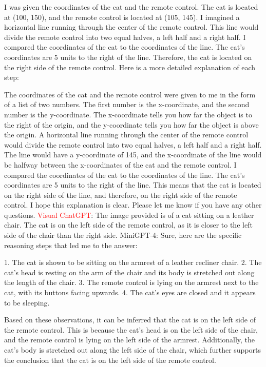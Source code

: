 \begin{enumerate}
        I was given the coordinates of the cat and the remote control. The cat is located at (100, 150), and the remote control is located at (105, 145).
        I imagined a horizontal line running through the center of the remote control. This line would divide the remote control into two equal halves, a left half and a right half.
        I compared the coordinates of the cat to the coordinates of the line. The cat's coordinates are 5 units to the right of the line.
        Therefore, the cat is located on the right side of the remote control.
        Here is a more detailed explanation of each step:

        The coordinates of the cat and the remote control were given to me in the form of a list of two numbers. The first number is the x-coordinate, and the second number is the y-coordinate. The x-coordinate tells you how far the object is to the right of the origin, and the y-coordinate tells you how far the object is above the origin.
        A horizontal line running through the center of the remote control would divide the remote control into two equal halves, a left half and a right half. The line would have a y-coordinate of 145, and the x-coordinate of the line would be halfway between the x-coordinates of the cat and the remote control.
        I compared the coordinates of the cat to the coordinates of the line. The cat's coordinates are 5 units to the right of the line. This means that the cat is located on the right side of the line, and therefore, on the right side of the remote control.
        I hope this explanation is clear. Please let me know if you have any other questions.
        \subitem \textcolor{red}{Visual ChatGPT}: The image provided is of a cat sitting on a leather chair. The cat is on the left side of the remote control, as it is closer to the left side of the chair than the right side.
        \subitem MiniGPT-4: Sure, here are the specific reasoning steps that led me to the answer:

        1. The cat is shown to be sitting on the armrest of a leather recliner chair.
        2. The cat’s head is resting on the arm of the chair and its body is stretched out along the length of the chair.
        3. The remote control is lying on the armrest next to the cat, with its buttons facing upwards.
        4. The cat’s eyes are closed and it appears to be sleeping.
        
        Based on these observations, it can be inferred that the cat is on the left side of the remote control. This is because the cat’s head is on the left side of the chair, and the remote control is lying on the left side of the armrest. Additionally, the cat’s body is stretched out along the left side of the chair, which further supports the conclusion that the cat is on the left side of the remote control.
    \end{enumerate}

